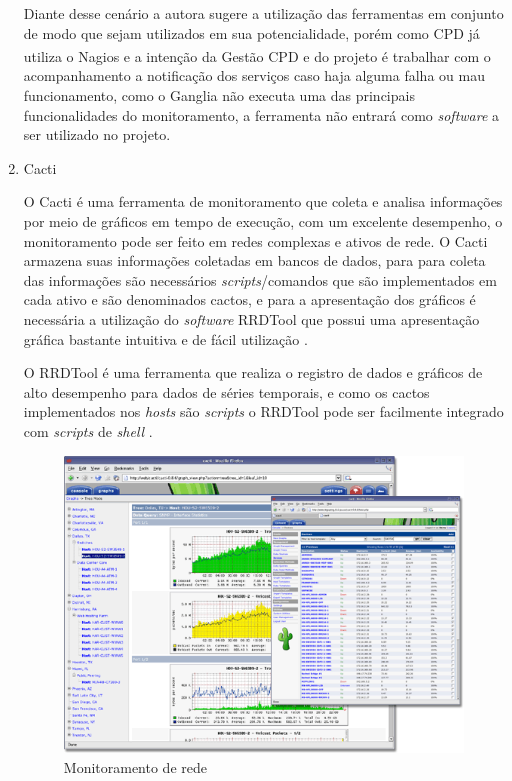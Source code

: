 \begin{enumerate}
\begin{itemize}
\end{itemize}

 Diante desse cenário a autora sugere a utilização das ferramentas em conjunto de modo que sejam utilizados em sua potencialidade, porém como \acrshort{CPD} já utiliza o Nagios\textsuperscript{\textregistered} e a intenção da Gestão \acrshort{CPD} e do projeto é trabalhar com o acompanhamento a notificação dos serviços caso haja alguma falha ou mau funcionamento, como o Ganglia não executa uma das principais funcionalidades do monitoramento, a ferramenta não entrará como \textit{software} a ser utilizado no projeto.
 
\item Cacti

O Cacti é uma ferramenta de monitoramento que coleta e analisa informações por meio de gráficos em tempo de execução, com um excelente desempenho, o monitoramento pode ser feito em redes complexas e ativos de rede. O Cacti armazena suas informações coletadas em bancos de dados, para para coleta das informações são necessários \textit{scripts}/comandos que são implementados em cada ativo e são denominados cactos, e para a apresentação dos gráficos é necessária a utilização do \textit{software}  \acrfull{RRDTool} que possui uma apresentação gráfica bastante intuitiva e de fácil utilização \cite{cacti}.

O \acrshort{RRDTool} é uma ferramenta que realiza o registro de dados e gráficos de alto desempenho para dados de séries temporais, e como os cactos implementados nos \textit{hosts} são \textit{scripts} o \acrshort{RRDTool} pode ser facilmente integrado com  \textit{scripts} de \textit{shell} \cite{rrdtool}. 

\begin{figure}[h!]
	\begin{center}
	\includegraphics[scale = 0.50]{img/cacti_promo_main.png}
		\caption{Monitoramento de rede \cite{cacti}}
		\label{fun:fig:cacti}
	\end{center}
\end{figure}


\end{enumerate}
